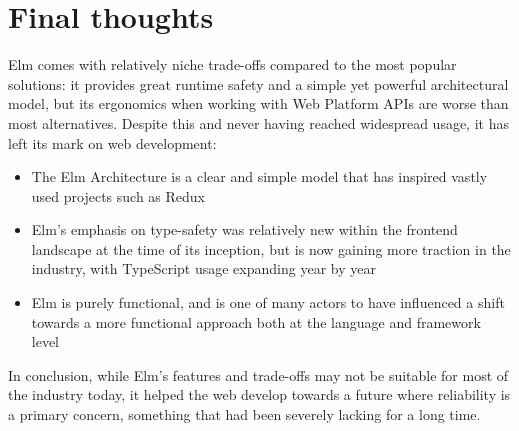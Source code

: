 \section{Final thoughts}
Elm comes with relatively niche trade-offs compared to the most popular solutions: it provides great runtime safety and a simple yet powerful architectural model, but its ergonomics when working with Web Platform APIs are worse than most alternatives. Despite this and never having reached widespread usage, it has left its mark on web development:
\begin{itemize}
    \item The Elm Architecture is a clear and simple model that has inspired vastly used projects such as Redux \cite{noauthor_prior_2024}
    \item Elm's emphasis on type-safety was relatively new within the frontend landscape at the time of its inception, but is now gaining more traction in the industry, with TypeScript usage expanding year by year \cite{staff_octoverse_2024}
    \item Elm is purely functional, and is one of many actors to have influenced a shift towards a more functional approach both at the language and framework level
\end{itemize}
In conclusion, while Elm's features and trade-offs may not be suitable for most of the industry today, it helped the web develop towards a future where reliability is a primary concern, something that had been severely lacking for a long time.
